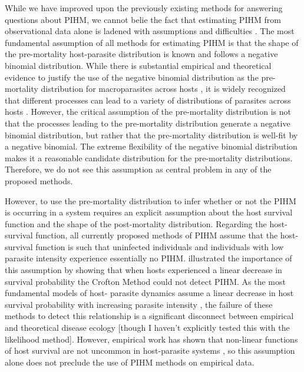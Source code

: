 \documentclass[12pt, a4paper]{article}
\begin{document}
While we have improved upon the previously existing methods for answering questions
about PIHM, we cannot belie the fact that estimating PIHM from observational
data alone is ladened with assumptions and difficulties \citep{McCallum2000a}.
The most fundamental assumption of all methods for estimating PIHM is that the
shape of the pre-mortality host-parasite distribution is known and follows a negative binomial distribution.
While there is substantial empirical and theoretical evidence to justify the
use of the negative binomial distribution as the pre-mortality distribution for
macroparasites across hosts \citep{Calabrese2011,Anderson1982a,Shaw1998}, it is
widely recognized that different processes can lead to a variety of
distributions of parasites across hosts \citep{Isham1995,Grenfell1995b,Wilson2002, Duerr2003}.  However, the
critical assumption of the pre-mortality distribution is not that the processes
leading to the pre-mortality distribution generate a negative binomial
distribution, but rather that the pre-mortality distribution is well-fit by a
negative binomial. The extreme flexibility of the negative binomial
distribution makes it a reasonable candidate distribution for the pre-mortality
distributions.  Therefore, we do not see this assumption as central problem in
any of the proposed methods.

However, to use the pre-mortality distribution to infer whether or not the PIHM
is occurring in a system requires an explicit assumption about the host
survival function and the shape of the post-mortality distribution.  Regarding
the host-survival function, all currently proposed methods of PIHM assume that
the host-survival function is such that uninfected individuals and individuals
with low parasite intensity experience essentially no PIHM.
\cite{Lanciani1989} illustrated the importance of this assumption by showing
that when hosts experienced a linear decrease in survival probability the
Crofton Method could not detect PIHM.   As the most fundamental models of host-
parasite dynamics assume a linear decrease in host survival probability with
increasing parasite intensity \citep{AndersonandMay1978}, the failure of these methods
to detect this relationship is a significant disconnect between empirical and
theoretical disease ecology [though I haven't explicitly tested this with the likelihood method].  However, empirical work has shown that non-linear
functions of host survival are not uncommon in host-parasite systems
\citep{Benesh2011}, so this assumption alone does not preclude the use of PIHM
methods on empirical data.
\end{document}
